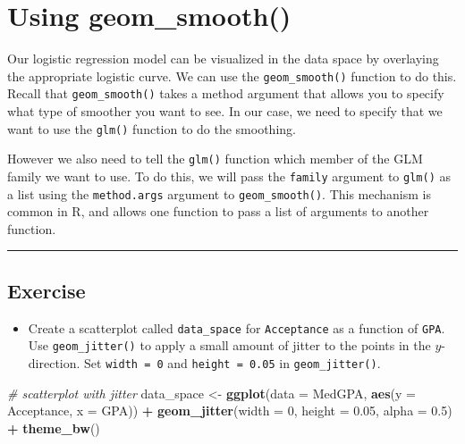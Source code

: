 \documentclass[
]{book}
\newenvironment{Shaded}{\begin{snugshade}}{\end{snugshade}}
\newcommand{\CommentTok}[1]{\textcolor[rgb]{0.56,0.35,0.01}{\textit{#1}}}
\newcommand{\DataTypeTok}[1]{\textcolor[rgb]{0.13,0.29,0.53}{#1}}
\newcommand{\DecValTok}[1]{\textcolor[rgb]{0.00,0.00,0.81}{#1}}
\newcommand{\FloatTok}[1]{\textcolor[rgb]{0.00,0.00,0.81}{#1}}
\newcommand{\KeywordTok}[1]{\textcolor[rgb]{0.13,0.29,0.53}{\textbf{#1}}}
\newcommand{\NormalTok}[1]{#1}
\newcommand{\OperatorTok}[1]{\textcolor[rgb]{0.81,0.36,0.00}{\textbf{#1}}}
\newcommand{\StringTok}[1]{\textcolor[rgb]{0.31,0.60,0.02}{#1}}
\providecommand{\tightlist}{%
  \setlength{\itemsep}{0pt}\setlength{\parskip}{0pt}}
\begin{document}
\hypertarget{using-geom_smooth}{%
\section{Using geom\_smooth()}\label{using-geom_smooth}}

Our logistic regression model can be visualized in the data space by overlaying the appropriate logistic curve. We can use the \texttt{geom\_smooth()} function to do this. Recall that \texttt{geom\_smooth()} takes a method argument that allows you to specify what type of smoother you want to see. In our case, we need to specify that we want to use the \texttt{glm()} function to do the smoothing.

However we also need to tell the \texttt{glm()} function which member of the GLM family we want to use. To do this, we will pass the \texttt{family} argument to \texttt{glm()} as a list using the \texttt{method.args} argument to \texttt{geom\_smooth()}. This mechanism is common in R, and allows one function to pass a list of arguments to another function.

\begin{center}\rule{0.5\linewidth}{0.5pt}\end{center}

\hypertarget{exercise-15}{%
\subsection*{Exercise}\label{exercise-15}}

\begin{itemize}
\tightlist
\item
  Create a scatterplot called \texttt{data\_space} for \texttt{Acceptance} as a function of \texttt{GPA}. Use \texttt{geom\_jitter()} to apply a small amount of jitter to the points in the \(y\)-direction. Set \texttt{width\ =\ 0} and \texttt{height\ =\ 0.05} in \texttt{geom\_jitter()}.
\end{itemize}

\begin{Shaded}
\begin{Highlighting}[]
\CommentTok{# scatterplot with jitter}
\NormalTok{data_space <-}\StringTok{ }\KeywordTok{ggplot}\NormalTok{(}\DataTypeTok{data =}\NormalTok{ MedGPA, }\KeywordTok{aes}\NormalTok{(}\DataTypeTok{y =}\NormalTok{ Acceptance, }\DataTypeTok{x =}\NormalTok{ GPA)) }\OperatorTok{+}\StringTok{ }
\StringTok{  }\KeywordTok{geom_jitter}\NormalTok{(}\DataTypeTok{width =} \DecValTok{0}\NormalTok{, }\DataTypeTok{height =} \FloatTok{0.05}\NormalTok{, }\DataTypeTok{alpha =} \FloatTok{0.5}\NormalTok{) }\OperatorTok{+}\StringTok{ }
\StringTok{  }\KeywordTok{theme_bw}\NormalTok{()}
\end{Highlighting}
\end{Shaded}
\end{document}
